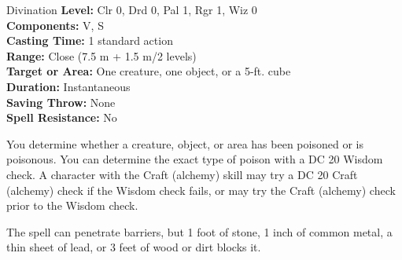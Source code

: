 {Divination}
{
	\textbf{Level:}
	Clr 0, Drd 0, Pal 1, Rgr 1, Wiz 0\\
	\textbf{Components:}
	V, S\\
	\textbf{Casting Time:}
	1 standard action\\
	\textbf{Range:}
	Close (7.5 m + 1.5 m/2 levels)\\
	\textbf{Target or Area:}
	One creature, one object, or a 5-ft. cube\\
	\textbf{Duration:}
	Instantaneous\\
	\textbf{Saving Throw:}
	None\\
	\textbf{Spell Resistance:}
	No\\
}
{
	You determine whether a creature, object, or area has been poisoned or is poisonous. You can determine the exact type of poison with a DC 20 Wisdom check. A character with the Craft (alchemy) skill may try a DC 20 Craft (alchemy) check if the Wisdom check fails, or may try the Craft (alchemy) check prior to the Wisdom check.

	The spell can penetrate barriers, but 1 foot of stone, 1 inch of common metal, a thin sheet of lead, or 3 feet of wood or dirt blocks it.

}
